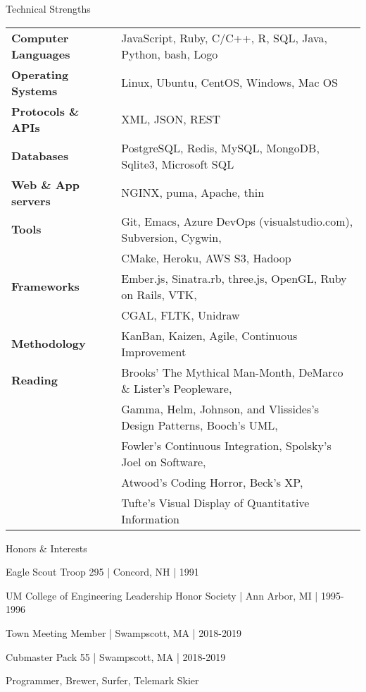 \documentclass{resume}
\begin{document}
\begin{rSection}{Technical Strengths}
\begin{tabular}{ @{} >{\bfseries}l @{\hspace{6ex}} l }
Computer Languages & JavaScript, Ruby, C\//C++, R, SQL, Java, Python, bash, Logo \\
Operating Systems & Linux, Ubuntu, CentOS, Windows, Mac OS \\
Protocols \& APIs & XML, JSON, REST \\
Databases & PostgreSQL, Redis, MySQL, MongoDB, Sqlite3, Microsoft SQL \\
Web \& App servers & NGINX, puma, Apache, thin \\
Tools & Git, Emacs, Azure DevOps (visualstudio.com), Subversion, Cygwin, \\
 & CMake, Heroku, AWS S3,  Hadoop \\
Frameworks & Ember.js, Sinatra.rb, three.js, OpenGL, Ruby on Rails, VTK, \\
 & CGAL, FLTK, Unidraw \\
Methodology & KanBan, Kaizen, Agile, Continuous Improvement \\
Reading & Brooks' The Mythical Man-Month, DeMarco \& Lister's Peopleware, \\
 & Gamma, Helm, Johnson, and Vlissides's Design Patterns, Booch's UML, \\
 & Fowler's Continuous Integration, Spolsky's Joel on Software, \\
 & Atwood's Coding Horror, Beck's XP, \\
 & Tufte's Visual Display of Quantitative Information
\end{tabular}
\end{rSection}

\begin{rSection}{Honors \& Interests}
\item Eagle Scout Troop 295 | Concord, NH | 1991
\item UM College of Engineering Leadership Honor Society | Ann Arbor, MI | 1995-1996
\item Town Meeting Member | Swampscott, MA | 2018-2019 
\item Cubmaster Pack 55 | Swampscott, MA | 2018-2019 
\item Programmer, Brewer, Surfer, Telemark Skier
\end{rSection}
\end{document}
